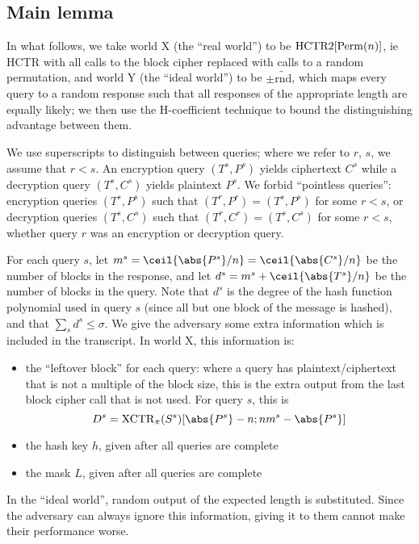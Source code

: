 \documentclass[hctr.tex]{subfiles}
\begin{document}
\subsection{Main lemma}\label{mainlemma}
In what follows, we take world X (the ``real world'') 
to be \(\operatorname{HCTR2}[\operatorname{Perm}(n)]\),
ie HCTR with all calls to the block cipher
replaced with calls to a random permutation,
and world Y (the ``ideal world'') to be \(\pm\widetilde{\mathrm{rnd}}\),
which maps every query to a random response such that
all responses of the appropriate length are equally likely;
we then use the H-coefficient technique to bound
the distinguishing advantage between them.

We use superscripts to distinguish between queries;
where we refer to \(r\), \(s\), we assume that \(r < s\).
An encryption query \((T^s, P^s)\) yields ciphertext \(C^s\)
while a decryption query \((T^s, C^s)\)
yields plaintext \(P^s\).
We forbid ``pointless queries'':
encryption queries \((T^s, P^s)\)
such that \((T^r, P^r) = (T^s, P^s)\) for some \(r < s\), 
or decryption queries \((T^s, C^s)\)
such that \((T^r, C^r) = (T^s, C^s)\) for some \(r < s\),
whether query \(r\) was an encryption or decryption query.

For each query \(s\), 
let \(m^s = \ceil{\abs{P^s}/n} = \ceil{\abs{C^s}/n}\)
be the number of blocks in the response,
and let \(d^s = m^s + \ceil{\abs{T^s}/n}\)
be the number of blocks in the query.
Note that \(d^s\) is the degree of the hash
function polynomial used in query \(s\)
(since all but one block of the message is hashed),
and that \(\sum_s d^s \leq \sigma\).
We give the adversary some extra information
which is included in the transcript.
In world X, this information is:
\begin{itemize}
    \item the ``leftover block'' for each query:
    where a query has plaintext/ciphertext
    that is not a multiple of the block size,
    this is the extra output from the last
    block cipher call that is not used.
    For query \(s\), this is 
    \begin{displaymath}
        D^s = \XCTR_\pi(S^s)[\abs{P^s} - n; nm^s-\abs{P^s}]
    \end{displaymath}
    \item the hash key \(h\), given after all queries are complete
    \item the mask \(L\), given after all queries are complete
\end{itemize}
In the ``ideal world'', random output of the expected
length is substituted. Since the adversary can always ignore
this information, giving it to them cannot make their performance worse.
\end{document}
